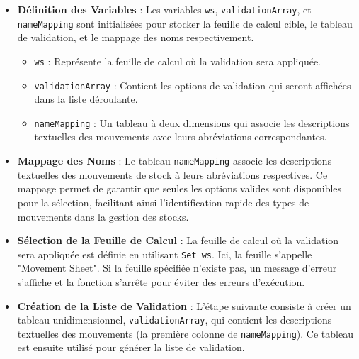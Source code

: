 \documentclass[a4paper, oneside, 12pt, final]{extreport}
\begin{document}
\begin{itemize}
    \item \textbf{Définition des Variables} : Les variables \texttt{ws}, \texttt{validationArray}, et \texttt{nameMapping} sont initialisées pour stocker la feuille de calcul cible, le tableau de validation, et le mappage des noms respectivement.
        \begin{itemize}
            \item \texttt{ws} : Représente la feuille de calcul où la validation sera appliquée.
            \item \texttt{validationArray} : Contient les options de validation qui seront affichées dans la liste déroulante.
            \item \texttt{nameMapping} : Un tableau à deux dimensions qui associe les descriptions textuelles des mouvements avec leurs abréviations correspondantes.
        \end{itemize}
    
    \item \textbf{Mappage des Noms} : Le tableau \texttt{nameMapping} associe les descriptions textuelles des mouvements de stock à leurs abréviations respectives. Ce mappage permet de garantir que seules les options valides sont disponibles pour la sélection, facilitant ainsi l'identification rapide des types de mouvements dans la gestion des stocks.

    \item \textbf{Sélection de la Feuille de Calcul} : La feuille de calcul où la validation sera appliquée est définie en utilisant \texttt{Set ws}. Ici, la feuille s'appelle "Movement Sheet". Si la feuille spécifiée n'existe pas, un message d'erreur s'affiche et la fonction s'arrête pour éviter des erreurs d'exécution.

    \item \textbf{Création de la Liste de Validation} : L'étape suivante consiste à créer un tableau unidimensionnel, \texttt{validationArray}, qui contient les descriptions textuelles des mouvements (la première colonne de \texttt{nameMapping}). Ce tableau est ensuite utilisé pour générer la liste de validation.


\end{itemize}
\end{document}
